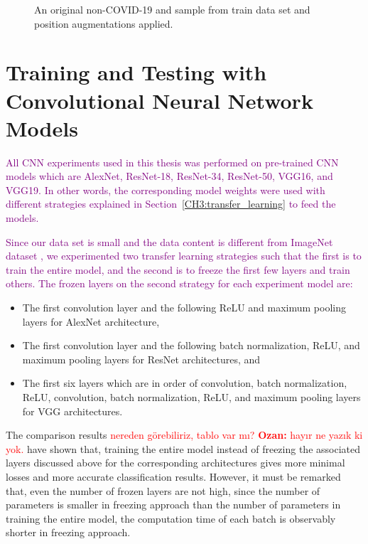 \begin{figure}[h]
	\caption{An original non-COVID-19 and sample from train data set and position augmentations applied.}
	\label{augmented_sample}
\end{figure}

\section{Training and Testing with Convolutional Neural Network Models}\label{sec:CH5_cnn_experiments}

\textcolor{purple}{All CNN experiments used in this thesis was performed on pre-trained CNN models which are AlexNet, ResNet-18, ResNet-34, ResNet-50, VGG16, and VGG19. In other words, the corresponding model weights were used with different strategies explained in Section~\ref{CH3:transfer_learning} to feed the models.}

\textcolor{purple}{Since our data set is small and the data content is different from ImageNet dataset \cite{imagenet}, we experimented two transfer learning strategies such that the first is to train the entire model, and the second is to freeze the first few layers and train others. The frozen layers on the second strategy for each experiment model are:}

\begin{itemize}
    \item The first convolution layer and the following ReLU and maximum pooling layers for AlexNet architecture,
    \item The first convolution layer and the following batch normalization, ReLU, and maximum pooling layers for ResNet architectures, and
    \item The first six layers which are in order of convolution, batch normalization, ReLU, convolution, batch normalization, ReLU, and maximum pooling layers for VGG architectures.
\end{itemize}

The comparison results \textcolor{red}{nereden görebiliriz, tablo var mı? \textbf{Ozan:} hayır ne yazık ki yok.} have shown that, training the entire model instead of freezing the associated layers discussed above for the corresponding architectures gives more minimal losses and more accurate classification results. However, it must be remarked that, even the number of frozen layers are not high, since the number of parameters is smaller in freezing approach than the number of parameters in training the entire model, the computation time of each batch is observably shorter in freezing approach.

